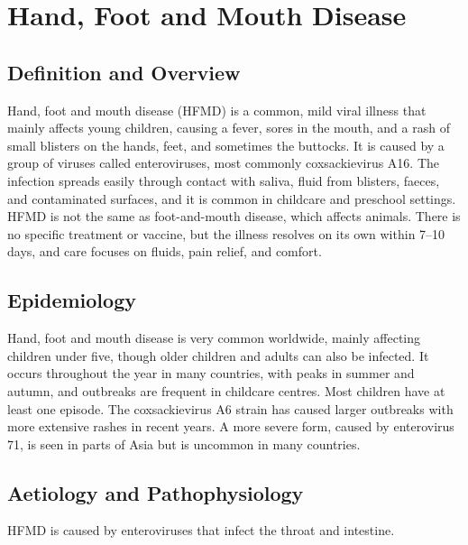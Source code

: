 \chapter{Hand, Foot and Mouth Disease}

\section*{Definition and Overview}
Hand, foot and mouth disease (HFMD) is a common, mild viral illness that mainly affects young children, causing a fever, sores in the mouth, and a rash of small blisters on the hands, feet, and sometimes the buttocks. It is caused by a group of viruses called enteroviruses, most commonly coxsackievirus A16. The infection spreads easily through contact with saliva, fluid from blisters, faeces, and contaminated surfaces, and it is common in childcare and preschool settings. HFMD is not the same as foot-and-mouth disease, which affects animals. There is no specific treatment or vaccine, but the illness resolves on its own within 7--10 days, and care focuses on fluids, pain relief, and comfort.

\section*{Epidemiology}
Hand, foot and mouth disease is very common worldwide, mainly affecting children under five, though older children and adults can also be infected. It occurs throughout the year in many countries, with peaks in summer and autumn, and outbreaks are frequent in childcare centres. Most children have at least one episode. The coxsackievirus A6 strain has caused larger outbreaks with more extensive rashes in recent years. A more severe form, caused by enterovirus 71, is seen in parts of Asia but is uncommon in many countries.

\section*{Aetiology and Pathophysiology}
HFMD is caused by enteroviruses that infect the throat and intestine.

